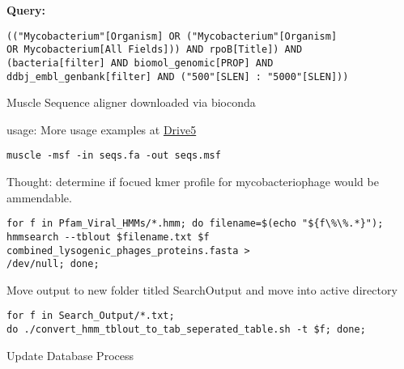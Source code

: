 \documentclass[idxtotoc,hyperref,openany,oneside]{labbook} %
\begin{document}

\textbf{Query:}
\begin{verbatim}
(("Mycobacterium"[Organism] OR ("Mycobacterium"[Organism] 
OR Mycobacterium[All Fields])) AND rpoB[Title]) AND 
(bacteria[filter] AND biomol_genomic[PROP] AND 
ddbj_embl_genbank[filter] AND ("500"[SLEN] : "5000"[SLEN]))
\end{verbatim}

Muscle Sequence aligner downloaded via bioconda

usage:
More usage examples at \href{http://www.drive5.com/muscle/muscle.html}{Drive5}


\begin{verbatim}
muscle -msf -in seqs.fa -out seqs.msf
\end{verbatim}





Thought: determine if focued kmer profile for mycobacteriophage would be ammendable.

\begin{verbatim}
for f in Pfam_Viral_HMMs/*.hmm; do filename=$(echo "${f\%\%.*}"); 
hmmsearch --tblout $filename.txt $f combined_lysogenic_phages_proteins.fasta >  
/dev/null; done;
\end{verbatim}

Move output to new folder titled SearchOutput and move into active directory

\begin{verbatim}
for f in Search_Output/*.txt; 
do ./convert_hmm_tblout_to_tab_seperated_table.sh -t $f; done;
\end{verbatim}







Update Database Process
\end{document}
